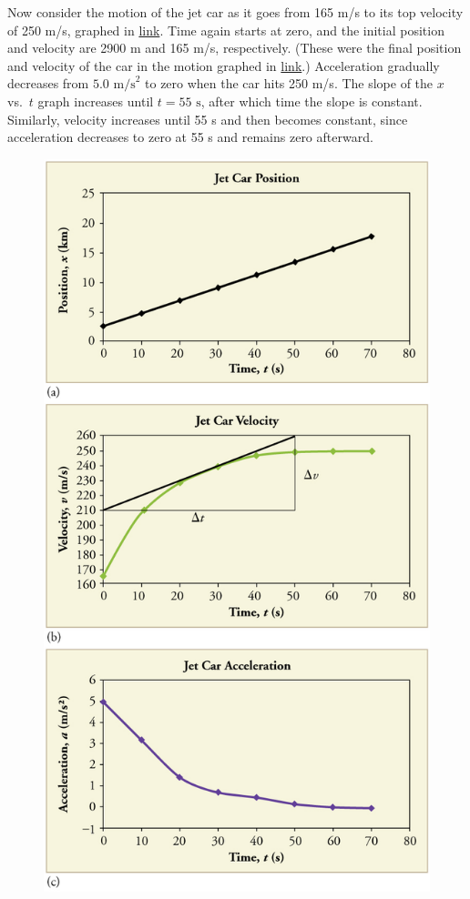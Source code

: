 \documentclass[
]{book}
\begin{document}
Now consider the motion of the jet car as it goes from 165 m/s to its
top velocity of 250 m/s, graphed in
\protect\hyperlink{import-auto-id1534076}{link}. Time again
starts at zero, and the initial position and velocity are 2900 m and 165
m/s, respectively. (These were the final position and velocity of the
car in the motion graphed in
\protect\hyperlink{import-auto-id3596921}{link}.) Acceleration
gradually decreases from \(5\text{.}\text{0\ m/s}^{2}\) to zero when the
car hits 250 m/s. The slope of the \(x{}\) vs.~\(t{}\) graph increases until
\({t = \text{55\ s}}{}\), after which time the slope is constant.
Similarly, velocity increases until 55 s and then becomes constant,
since acceleration decreases to zero at 55 s and remains zero afterward.

\begin{figure}
\hypertarget{import-auto-id1534076}{%
\centering
\includegraphics{images/Figure_02_07_04.jpg}
}
\end{figure}
\end{document}
